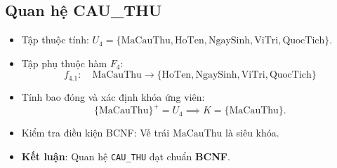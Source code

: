 \subsection{Quan hệ CAU\_THU}
\begin{itemize}
    \item Tập thuộc tính: $U_4 = \{\text{MaCauThu}, \text{HoTen}, \text{NgaySinh}, \text{ViTri}, \text{QuocTich}\}$.
    \item Tập phụ thuộc hàm $F_4$:
    $$f_{4.1}: \quad \text{MaCauThu} \rightarrow \{\text{HoTen}, \text{NgaySinh}, \text{ViTri}, \text{QuocTich}\}$$
    \item Tính bao đóng và xác định khóa ứng viên:
    $$\{\text{MaCauThu}\}^+ = U_4 \implies K = \{\text{MaCauThu}\}.$$
    \item Kiểm tra điều kiện BCNF: Vế trái $\text{MaCauThu}$ là siêu khóa.
    \item \textbf{Kết luận}: Quan hệ \texttt{CAU\_THU} đạt chuẩn \textbf{BCNF}.
\end{itemize}

